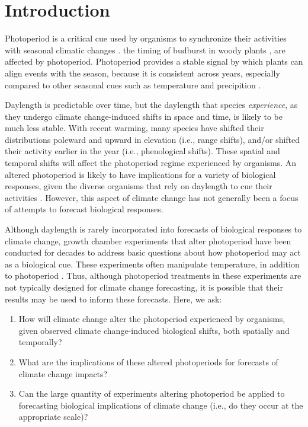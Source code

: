 \documentclass{article}
\begin{document}
\section*{Introduction}
\par Photoperiod is a critical cue used by organisms to synchronize their activities with seasonal climatic changes \citep[e.g.,][]{Hsu:2011,Singh:2017,Basler:2012}. the timing of budburst in woody plants \citep{Flynn:2018,solbakken1994}, are affected by photoperiod. Photoperiod provides a stable signal by which plants can align events with the season, because it is consistent across years, especially compared to other seasonal cues such as temperature and precipition \citep{saikkonen2012}. 
\par Daylength is predictable over time, but the daylength that species \emph{experience}, as they undergo climate change-induced shifts in space and time, is likely to be much less stable. With recent warming, many species have shifted their distributions poleward and upward in elevation (i.e., range shifts), and/or shifted their activity earlier in the year (i.e., phenological shifts). These spatial and temporal shifts will affect the photoperiod regime experienced by organisms. An altered photoperiod is likely to have implications for a variety of biological responses, given the diverse organisms that rely on daylength to cue their activities \citep[e.g.,][] {mcallan2006,linn1996,Flynn:2018,solbakken1994}. However,  this aspect of climate change has not generally been a focus of attempts to forecast biological responses.

\par Although daylength is rarely incorporated into forecasts of biological responses to climate change, growth chamber experiments that alter photoperiod have been conducted for decades to address basic questions about how photoperiod may act as a biological cue. These experiments often manipulate temperature, in addition to photoperiod \citep[e.g.,][]{Campbell:1975aa,HEIDE:1977aa,Falusi:1990aa,Spann:2004aa,Laube:2014a}. Thus, although photoperiod treatments in these experiments are not typically designed for climate change forecasting, it is possible that their results may be used to inform these forecasts. 
Here, we ask: 
\begin{enumerate}
\item How will climate change alter the photoperiod experienced by organisms, given observed climate change-induced biological shifts, both spatially and temporally?
\item What are the implications of these altered photoperiods for forecasts of climate change impacts?
\item Can the large quantity of experiments altering photoperiod be applied to forecasting biological implications of climate change (i.e., do they occur at the appropriate scale)?
\end{enumerate}
\end{document}
